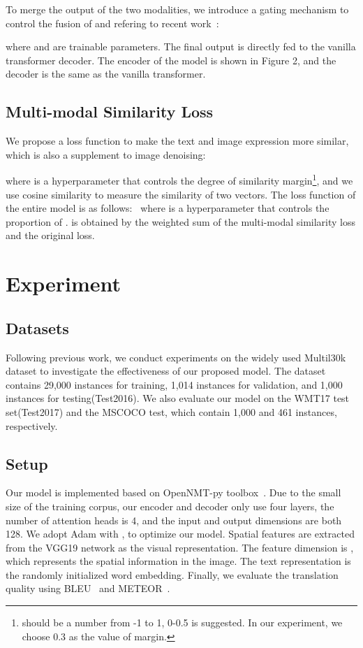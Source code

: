 \documentclass[11pt]{article}
\begin{document}
To merge the output of the two modalities,  we introduce a gating mechanism to control the fusion of  and  refering to recent work~\citep{DBLP:conf/iclr/0001C0USLZ20}:


where  and  are trainable parameters. The final output  is directly fed to the vanilla transformer decoder.
The encoder of the model is shown in Figure 2, and the decoder is the same as the vanilla transformer.



\subsection{Multi-modal Similarity Loss}
We propose a loss function to make the text and image expression more similar, which is also a supplement to image denoising:



where  is a hyperparameter that controls the degree of similarity margin\footnote{ should be a number from -1 to 1, 0-0.5 is suggested. In our experiment, we choose 0.3 as the value of margin.}, and we use cosine similarity to measure the similarity of two vectors. The loss function of the entire model is as follows:
\
where  is a hyperparameter that controls the proportion of .
 is obtained by the weighted sum of the multi-modal similarity loss and the original loss.





\section{Experiment}





\subsection{Datasets}
Following previous work, we conduct experiments on the widely used  Multil30k~\citep{DBLP:conf/acl/ElliottFSS16} dataset to investigate the effectiveness of our proposed model. 
The dataset contains 29,000 instances for training, 1,014 instances for validation, and 1,000 instances for testing(Test2016). We also evaluate our model on the WMT17 test set(Test2017) and the MSCOCO test, which contain 1,000 and 461 instances, respectively.

\subsection{Setup}
Our model is implemented based on OpenNMT-py toolbox~\citep{DBLP:conf/acl/KleinKDSR17}. Due to the small size of the training corpus, our encoder and decoder only use four layers, the number of attention heads is 4, and the input and output dimensions are both 128. We adopt Adam with ,  to optimize our model.
Spatial features are extracted from the VGG19 network as the visual representation. The feature dimension is  , which represents the spatial information in the image. The text representation is the randomly initialized word embedding. 
Finally, we evaluate the translation quality using BLEU~\citep{DBLP:conf/acl/PapineniRWZ02} and METEOR~\citep{DBLP:conf/wmt/DenkowskiL11}.
\end{document}
